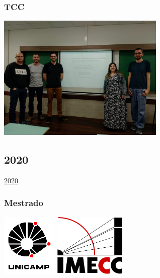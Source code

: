 \documentclass[10pt,
  aspectratio=169,
  serif,
  mathserif,
  professionalfont,
  compress,
  handout,
  ]{beamer}\usepackage[]{graphicx}\usepackage[]{color}
\begin{document}

\begin{frame}

\frametitle{TCC}

\begin{center}
  \includegraphics[height=6cm]{img/tcc.jpg}
\end{center}

\end{frame}


\subsection{2020}

\begin{frame}[c, allowframebreaks]

\begin{center}

  {\huge \href{https://lineu96.github.io/st/}{2020}}
  
\end{center}

\end{frame}


\begin{frame}

\frametitle{Mestrado}

\begin{center}
  \includegraphics[height=3cm]{img/unicamp.jpeg}\hspace{2em}
  \includegraphics[height=3cm]{img/imecc.png}
\end{center}

\end{frame}
\end{document}
